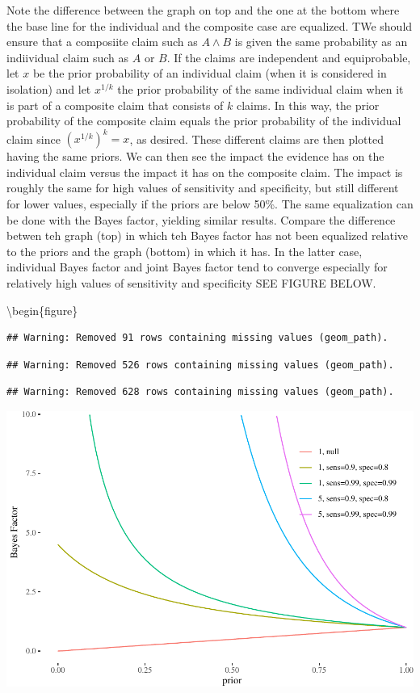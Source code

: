 \documentclass[10pt,dvipsnames,enabledeprecatedfontcommands]{scrartcl}
\begin{document}
Note the difference between the graph on top and the one at the bottom
where the base line for the individual and the composite case are
equalized. TWe should ensure that a composiite claim such as
\(A \wedge B\) is given the same probability as an indiividual claim
such as \(A\) or \(B\). If the claims are independent and equiprobable,
let \(x\) be the prior probability of an individual claim (when it is
considered in isolation) and let \(x^{1/k}\) the prior probability of
the same individual claim when it is part of a composite claim that
consists of \(k\) claims. In this way, the prior probability of the
composite claim equals the prior probability of the individual claim
since \((x^{1/k})^k=x\), as desired. These different claims are then
plotted having the same priors. We can then see the impact the evidence
has on the individual claim versus the impact it has on the composite
claim. The impact is roughly the same for high values of sensitivity and
specificity, but still different for lower values, especially if the
priors are below 50\%. The same equalization can be done with the Bayes
factor, yielding similar results. Compare the difference betwen teh
graph (top) in which teh Bayes factor has not been equalized relative to
the priors and the graph (bottom) in which it has. In the latter case,
individual Bayes factor and joint Bayes factor tend to converge
especially for relatively high values of sensitivity and specificity SEE
FIGURE BELOW.

\textbackslash{}begin\{figure\}

\begin{verbatim}
## Warning: Removed 91 rows containing missing values (geom_path).
\end{verbatim}

\begin{verbatim}
## Warning: Removed 526 rows containing missing values (geom_path).
\end{verbatim}

\begin{verbatim}
## Warning: Removed 628 rows containing missing values (geom_path).
\end{verbatim}

\begin{center}\includegraphics[width=0.9\linewidth]{conjunction-paradox_files/figure-latex/unnamed-chunk-16-1} \end{center}
\end{document}
